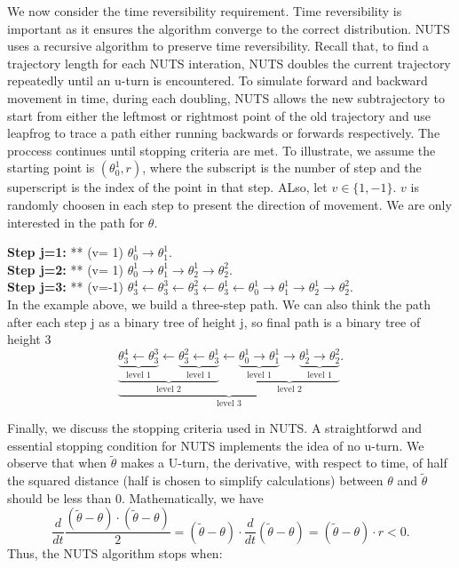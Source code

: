 \documentclass{article}
\begin{document}
We now consider the time reversibility requirement. Time reversibility is important as it ensures the algorithm converge to the correct distribution. NUTS uses a recursive algorithm to preserve time reversibility. Recall that, to find a trajectory length for each NUTS interation, NUTS doubles the current trajectory repeatedly until an u-turn is encountered. To simulate forward and backward movement in time, during each doubling, NUTS allows the new subtrajectory to start from either the leftmost or rightmost point of the old trajectory and use leapfrog to trace a path either running backwards or forwards respectively. The proccess continues until stopping criteria are met. To illustrate, we assume the starting point is $(\theta_0^1,r)$, where the subscript is the number of step and the superscript is the index of the point in that step. ALso, let $v\in\{1,-1\}$. $v$ is randomly choosen in each step to present the direction of movement. We are only interested in the path for $\theta$.

\textbf{Step j=1:}   ** (v= 1)  $\theta_0^1 \rightarrow \theta_1^1.$ \\
\textbf{Step j=2:}   ** (v= 1)  $\theta_0^1 \rightarrow \theta_1^1 \rightarrow \theta_2^1 \rightarrow \theta_2^2.$ \\
\textbf{Step j=3:}   ** (v=-1)  $\theta_3^4\leftarrow\theta_3^3\leftarrow\theta_3^2\leftarrow \theta_3^1\leftarrow\theta_0^1 \rightarrow \theta_1^1 \rightarrow \theta_2^1 \rightarrow \theta_2^2.$ \\

In the example above, we build a three-step path. We can also think the path after each step j as a binary tree of height j, so final path is a binary tree of height 3
$$\underbrace{\underbrace{\underbrace{\theta_3^4\leftarrow\theta_3^3}_{\text{level }1}\leftarrow\underbrace{\theta_3^2\leftarrow \theta_3^1}_{\text{level }1}}_{\text{level }2}\leftarrow\underbrace{\underbrace{\theta_0^1 \rightarrow \theta_1^1}_{\text{level }1} \rightarrow \underbrace{\theta_2^1 \rightarrow \theta_2^2}_{\text{level }1}}_{\text{level }2}}_{\text{level }3}.$$

Finally, we discuss the stopping criteria used in NUTS. A straightforwd and essential stopping condition for NUTS implements the idea of no u-turn. We observe that when $\tilde{\theta}$ makes a U-turn, the derivative, with respect to time, of half the squared distance (half is chosen to simplify calculations) between $\theta$ and $\tilde{\theta}$ should be less than 0. Mathematically, we have
$$
\frac{d}{dt}\frac{(\tilde{\theta}-\theta)\cdot (\tilde{\theta}-\theta)}{2} = (\tilde{\theta}-\theta)\cdot\frac{d}{dt}(\tilde{\theta}-\theta)= (\tilde{\theta}-\theta)\cdot r < 0.$$
Thus, the NUTS algorithm stops when:
\end{document}
